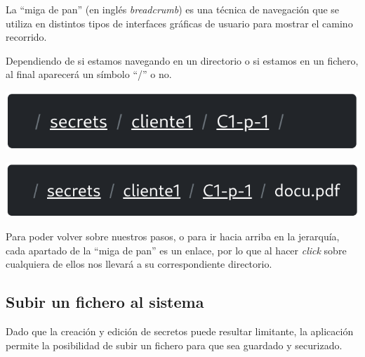 \documentclass{\ClassPath/viu-tfm-template}
\begin{document}
La “miga de pan” (en inglés \textit{breadcrumb}) es una técnica de navegación que se utiliza en distintos tipos de interfaces gráficas de usuario para mostrar el camino recorrido.

Dependiendo de si estamos navegando en un directorio o si estamos en un fichero, al final aparecerá un símbolo “/” o no.

\begin{center}
    \includegraphics[width=0.6\linewidth]{img/breadcrumb1.png}
\end{center}
\begin{center}
    \includegraphics[width=0.6\linewidth]{img/breadcrumb2.png}
\end{center}

Para poder volver sobre nuestros pasos, o para ir hacia arriba en la jerarquía, cada apartado de la “miga de pan” es un enlace, por lo que al hacer \textit{click} sobre cualquiera de ellos nos llevará a su correspondiente directorio.


\subsection{Subir un fichero al sistema}

Dado que la creación y edición de secretos puede resultar limitante, la aplicación permite la posibilidad de subir un fichero para que sea guardado y securizado.
\end{document}
